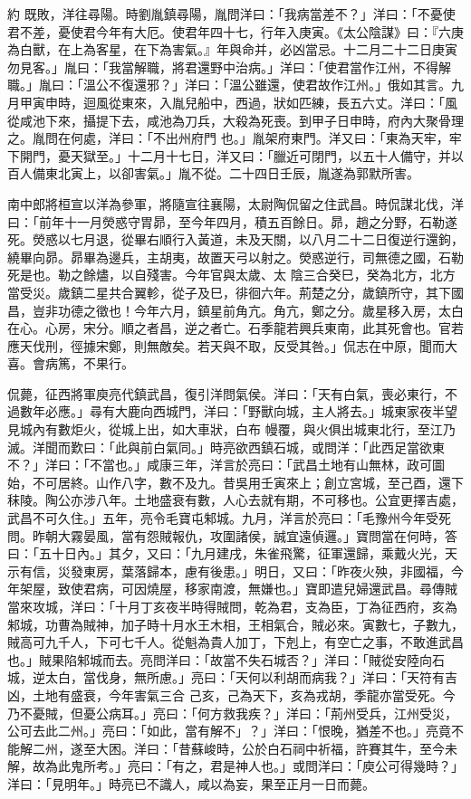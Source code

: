 \begin{pinyinscope}
 約
 既敗，洋往尋陽。時劉胤鎮尋陽，胤問洋曰：「我病當差不？」洋曰：「不憂使君不差，憂使君今年有大厄。使君年四十七，行年入庚寅。《太公陰謀》曰：『六庚為白獸，在上為客星，在下為害氣。』年與命并，必凶當忌。十二月二十二日庚寅勿見客。」胤曰：「我當解職，將君還野中治病。」洋曰：「使君當作江州，不得解職。」胤曰：「溫公不復還邪？」洋曰：「溫公雖還，使君故作江州。」俄如其言。九月甲寅申時，迴風從東來，入胤兒船中，西過，狀如匹練，長五六丈。洋曰：「風從咸池下來，攝提下去，咸池為刀兵，大殺為死喪。到甲子日申時，府內大聚骨理之。胤問在何處，洋曰：「不出州府門
 也。」胤架府東門。洋又曰：「東為天牢，牢下開門，憂天獄至。」十二月十七日，洋又曰：「臘近可閉門，以五十人備守，并以百人備東北寅上，以卻害氣。」胤不從。二十四日壬辰，胤遂為郭默所害。



 南中郎將桓宣以洋為參軍，將隨宣往襄陽，太尉陶侃留之住武昌。時侃謀北伐，洋曰：「前年十一月熒惑守胃昴，至今年四月，積五百餘日。昴，趙之分野，石勒遂死。熒惑以七月退，從畢右順行入黃道，未及天關，以八月二十二日復逆行還鉤，繞畢向昴。昴畢為邊兵，主胡夷，故置天弓以射之。熒惑逆行，司無德之國，石勒死是也。勒之餘燼，以自殘害。今年官與太歲、太
 陰三合癸巳，癸為北方，北方當受災。歲鎮二星共合翼軫，從子及巳，徘徊六年。荊楚之分，歲鎮所守，其下國昌，豈非功德之徵也！今年六月，鎮星前角亢。角亢，鄭之分。歲星移入房，太白在心。心房，宋分。順之者昌，逆之者亡。石季龍若興兵東南，此其死會也。官若應天伐刑，徑據宋鄭，則無敵矣。若天與不取，反受其咎。」侃志在中原，聞而大喜。會病篤，不果行。



 侃薨，征西將軍庾亮代鎮武昌，復引洋問氣侯。洋曰：「天有白氣，喪必東行，不過數年必應。」尋有大鹿向西城門，洋曰：「野獸向城，主人將去。」城東家夜半望見城內有數炬火，從城上出，如大車狀，白布
 幔覆，與火俱出城東北行，至江乃滅。洋聞而歎曰：「此與前白氣同。」時亮欲西鎮石城，或問洋：「此西足當欲東不？」洋曰：「不當也。」咸康三年，洋言於亮曰：「武昌土地有山無林，政可圖始，不可居終。山作八字，數不及九。昔吳用壬寅來上；創立宮城，至己酉，還下秣陵。陶公亦涉八年。土地盛衰有數，人心去就有期，不可移也。公宜更擇吉處，武昌不可久住。」五年，亮令毛寶屯邾城。九月，洋言於亮曰：「毛豫州今年受死問。昨朝大霧晏風，當有怨賊報仇，攻圍諸侯，誠宜遠偵邏。」寶問當在何時，答曰：「五十日內。」其夕，又曰：「九月建戌，朱雀飛驚，征軍還歸，乘戴火光，天
 示有信，災發東房，葉落歸本，慮有後患。」明日，又曰：「昨夜火殃，非國福，今年架屋，致使君病，可因燒屋，移家南渡，無嫌也。」寶即遣兒婦還武昌。尋傳賊當來攻城，洋曰：「十月丁亥夜半時得賊問，乾為君，支為臣，丁為征西府，亥為邾城，功曹為賊神，加子時十月水王木相，王相氣合，賊必來。寅數七，子數九，賊高可九千人，下可七千人。從魁為貴人加丁，下剋上，有空亡之事，不敢進武昌也。」賊果陷邾城而去。亮問洋曰：「故當不失石城否？」洋曰：「賊從安陸向石城，逆太白，當伐身，無所慮。」亮曰：「天何以利胡而病我？」洋曰：「天符有吉凶，土地有盛衰，今年害氣三合
 己亥，己為天下，亥為戎胡，季龍亦當受死。今乃不憂賊，但憂公病耳。」亮曰：「何方救我疾？」洋曰：「荊州受兵，江州受災，公可去此二州。」亮曰：「如此，當有解不」？」洋曰：「恨晚，猶差不也。」亮竟不能解二州，遂至大困。洋曰：「昔蘇峻時，公於白石祠中祈福，許賽其牛，至今未解，故為此鬼所考。」亮曰：「有之，君是神人也。」或問洋曰：「庾公可得幾時？」洋曰：「見明年。」時亮已不識人，咸以為妄，果至正月一日而薨。




\end{pinyinscope}
